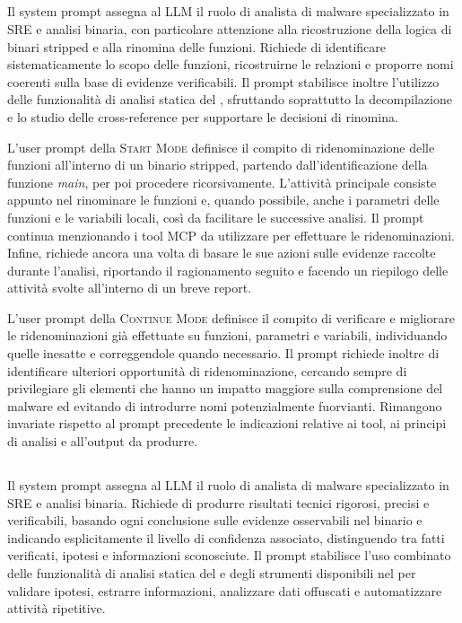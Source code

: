 \subsection{\renaming{}} %

Il system prompt assegna al LLM il ruolo di analista di malware specializzato in SRE e analisi binaria, con particolare attenzione alla ricostruzione della logica di binari stripped e alla rinomina delle funzioni. Richiede di identificare sistematicamente lo scopo delle funzioni, ricostruirne le relazioni e proporre nomi coerenti sulla base di evidenze verificabili. Il prompt stabilisce inoltre l'utilizzo delle funzionalità di analisi statica del \sreframework{}, sfruttando soprattutto la decompilazione e lo studio delle cross-reference per supportare le decisioni di rinomina.

L'user prompt della \textsc{Start Mode} definisce il compito di ridenominazione delle funzioni all'interno di un binario stripped, partendo dall'identificazione della funzione \emph{main}, per poi procedere ricorsivamente. L'attività principale consiste appunto nel rinominare le funzioni e, quando possibile, anche i parametri delle funzioni e le variabili locali, così da facilitare le successive analisi. Il prompt continua menzionando i tool MCP da utilizzare per effettuare le ridenominazioni. Infine, richiede ancora una volta di basare le sue azioni sulle evidenze raccolte durante l'analisi, riportando il ragionamento seguito e facendo un riepilogo delle attività svolte all'interno di un breve report.


L'user prompt della \textsc{Continue Mode} definisce il compito di verificare e migliorare le ridenominazioni già effettuate su funzioni, parametri e variabili, individuando quelle inesatte e correggendole quando necessario. Il prompt richiede inoltre di identificare ulteriori opportunità di ridenominazione, cercando sempre di privilegiare gli elementi che hanno un impatto maggiore sulla comprensione del malware ed evitando di introdurre nomi potenzialmente fuorvianti. Rimangono invariate rispetto al prompt precedente le indicazioni relative ai tool, ai principi di analisi e all'output da produrre.

\subsection{\reversing{}} %

Il system prompt assegna al LLM il ruolo di analista di malware specializzato in SRE e analisi binaria. Richiede di produrre risultati tecnici rigorosi, precisi e verificabili, basando ogni conclusione sulle evidenze osservabili nel binario e indicando esplicitamente il livello di confidenza associato, distinguendo tra fatti verificati, ipotesi e informazioni sconosciute. Il prompt stabilisce l'uso combinato delle funzionalità di analisi statica del \sreframework{} e degli strumenti disponibili nel \sandbox{} per validare ipotesi, estrarre informazioni, analizzare dati offuscati e automatizzare attività ripetitive.

